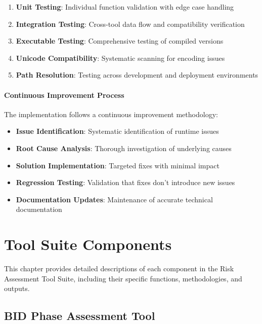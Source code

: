 \documentclass[binding=0.6cm]{sapthesis}
\begin{document}
\begin{enumerate}
    \item \textbf{Unit Testing}: Individual function validation with edge case handling
    \item \textbf{Integration Testing}: Cross-tool data flow and compatibility verification
    \item \textbf{Executable Testing}: Comprehensive testing of compiled versions
    \item \textbf{Unicode Compatibility}: Systematic scanning for encoding issues
    \item \textbf{Path Resolution}: Testing across development and deployment environments
\end{enumerate}

\subsubsection{Continuous Improvement Process}

The implementation follows a continuous improvement methodology:

\begin{itemize}
    \item \textbf{Issue Identification}: Systematic identification of runtime issues
    \item \textbf{Root Cause Analysis}: Thorough investigation of underlying causes
    \item \textbf{Solution Implementation}: Targeted fixes with minimal impact
    \item \textbf{Regression Testing}: Validation that fixes don't introduce new issues
    \item \textbf{Documentation Updates}: Maintenance of accurate technical documentation
\end{itemize}

\chapter{Tool Suite Components}
\label{ch:components}

This chapter provides detailed descriptions of each component in the Risk Assessment Tool Suite, including their specific functions, methodologies, and outputs.

\section{BID Phase Assessment Tool}
\end{document}
